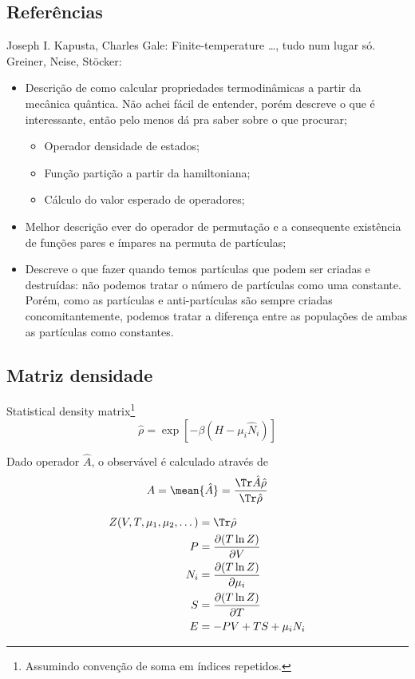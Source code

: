 \subsection{Referências}
Joseph I. Kapusta, Charles Gale: Finite-temperature \dots, tudo num lugar só.
Greiner, Neise, Stöcker:
\begin{itemize}
	\item Descrição de como calcular propriedades termodinâmicas a partir da mecânica quântica. Não achei fácil de entender, porém descreve o que é interessante, então pelo menos dá pra saber sobre o que procurar;
	\begin{itemize}
            \item Operador densidade de estados;
            \item Função partição a partir da hamiltoniana;
            \item Cálculo do valor esperado de operadores;
    \end{itemize}
    \item Melhor descrição ever do operador de permutação e a consequente existência de funções pares e ímpares na permuta de partículas;
    \item Descreve o que fazer quando temos partículas que podem ser criadas e destruídas: não podemos tratar o número de partículas como uma constante. Porém, como as partículas e anti-partículas são sempre criadas concomitantemente, podemos tratar a diferença entre as populações de ambas as partículas como constantes.
\end{itemize}

\subsection{Matriz densidade}

Statistical density matrix\footnote{Assumindo convenção de soma em índices repetidos.}
\begin{equation}
	\hat{\rho} = \exp\left[-\beta(H-\mu_i\hat{N}_i)\right]
\end{equation}

Dado operador $\hat{A}$, o observável é calculado através de
\begin{equation}
	A = \mean{\hat{A}} = \frac{\Tr \hat{A}\hat{\rho}}{\Tr \hat{\rho}}
\end{equation}

\begin{align}
	Z(V, T, \mu_1, \mu_2, \dots) &= \Tr \hat{\rho} \\
	P &= \frac{\partial(T\ln Z)}{\partial V} \\
	N_i &= \frac{\partial (T \ln Z)}{\partial \mu_i} \\
	S &= \frac{\partial (T \ln Z)}{\partial T} \\
	E &= - PV + TS + \mu_i N_i
\end{align}

